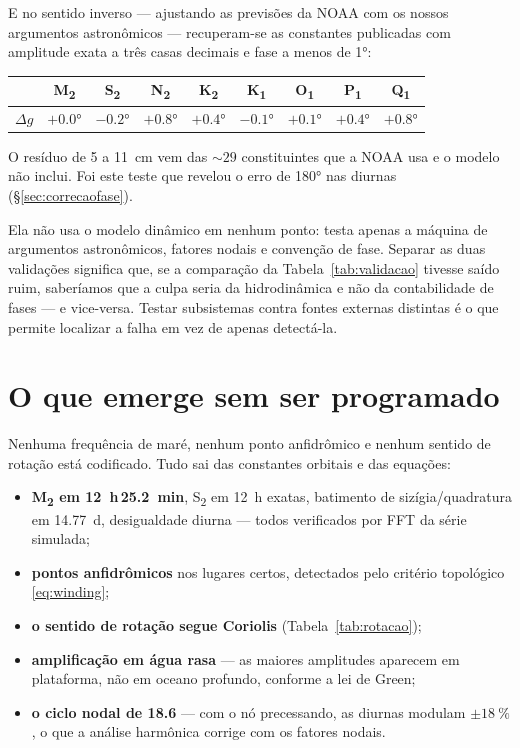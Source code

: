 \documentclass[11pt,a4paper,oneside]{report}
\theoremstyle{definition}
\theoremstyle{plain}
\theoremstyle{remark}
\begin{document}
E no sentido inverso — ajustando as previsões da NOAA com os nossos argumentos
astronômicos — recuperam-se as constantes publicadas com amplitude exata a três
casas decimais e fase a menos de \ang{1}:

\begin{center}
\begin{tabular}{@{}lcccccccc@{}}
\toprule
& M\textsubscript{2} & S\textsubscript{2} & N\textsubscript{2} & K\textsubscript{2}
& K\textsubscript{1} & O\textsubscript{1} & P\textsubscript{1} & Q\textsubscript{1} \\
\midrule
$\Delta g$ & $+\ang{0.0}$ & $-\ang{0.2}$ & $+\ang{0.8}$ & $+\ang{0.4}$
& $-\ang{0.1}$ & $+\ang{0.1}$ & $+\ang{0.4}$ & $+\ang{0.8}$ \\
\bottomrule
\end{tabular}
\end{center}

O resíduo de 5 a \SI{11}{\centi\meter} vem das $\sim\!29$ constituintes que a
NOAA usa e o modelo não inclui. Foi este teste que revelou o erro de
\ang{180} nas diurnas (\S\ref{sec:correcaofase}).

\begin{caixa}
Ela não usa o modelo dinâmico em nenhum ponto: testa apenas a máquina de
argumentos astronômicos, fatores nodais e convenção de fase. Separar as duas
validações significa que, se a comparação da Tabela~\ref{tab:validacao} tivesse
saído ruim, saberíamos que a culpa seria da hidrodinâmica e não da contabilidade
de fases — e vice-versa. Testar subsistemas contra fontes externas distintas é
o que permite localizar a falha em vez de apenas detectá-la.
\end{caixa}

\section{O que emerge sem ser programado}

Nenhuma frequência de maré, nenhum ponto anfidrômico e nenhum sentido de
rotação está codificado. Tudo sai das constantes orbitais e das equações:

\begin{itemize}
\item \textbf{M\textsubscript{2} em \SI{12}{\hour}\,\SI{25.2}{\minute}},
  S\textsubscript{2} em \SI{12}{\hour} exatas, batimento de sizígia/quadratura
  em \SI{14.77}{\day}, desigualdade diurna — todos verificados por FFT da série
  simulada;
\item \textbf{pontos anfidrômicos} nos lugares certos, detectados pelo critério
  topológico \eqref{eq:winding};
\item \textbf{o sentido de rotação segue Coriolis} (Tabela~\ref{tab:rotacao});
\item \textbf{amplificação em água rasa} — as maiores amplitudes aparecem em
  plataforma, não em oceano profundo, conforme a lei de Green;
\item \textbf{o ciclo nodal de \SI{18.6}{\anos}} — com o nó precessando, as
  diurnas modulam $\pm\SI{18}{\percent}$, o que a análise harmônica corrige com
  os fatores nodais.
\end{itemize}
\end{document}
